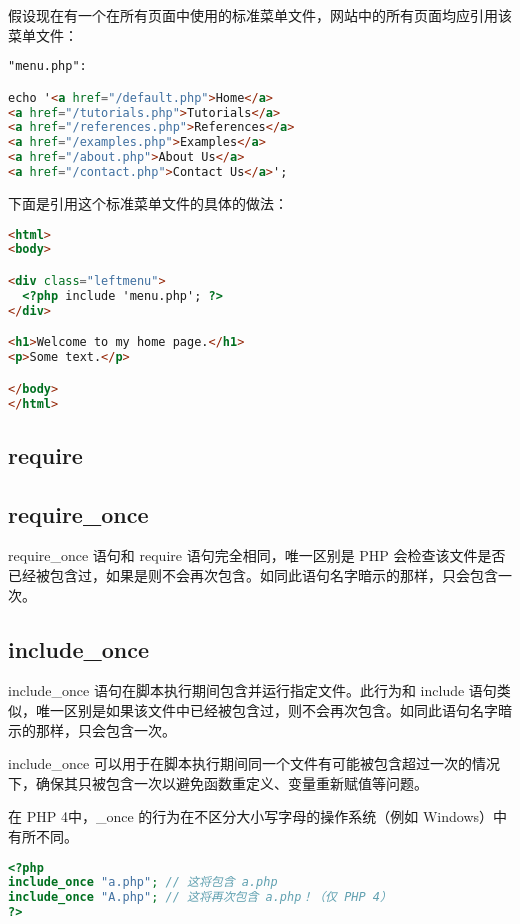 假设现在有一个在所有页面中使用的标准菜单文件，网站中的所有页面均应引用该菜单文件：

\begin{lstlisting}[language=HTML]
"menu.php":

echo '<a href="/default.php">Home</a>
<a href="/tutorials.php">Tutorials</a>
<a href="/references.php">References</a>
<a href="/examples.php">Examples</a>
<a href="/about.php">About Us</a>
<a href="/contact.php">Contact Us</a>';
\end{lstlisting}

下面是引用这个标准菜单文件的具体的做法：

\begin{lstlisting}[language=HTML]
<html>
<body>

<div class="leftmenu">
  <?php include 'menu.php'; ?>
</div>

<h1>Welcome to my home page.</h1>
<p>Some text.</p>

</body>
</html>
\end{lstlisting}


\subsection{require}



\subsection{require\_once}

require\_once 语句和 require 语句完全相同，唯一区别是 PHP 会检查该文件是否已经被包含过，如果是则不会再次包含。如同此语句名字暗示的那样，只会包含一次。

\subsection{include\_once}

include\_once 语句在脚本执行期间包含并运行指定文件。此行为和 include 语句类似，唯一区别是如果该文件中已经被包含过，则不会再次包含。如同此语句名字暗示的那样，只会包含一次。

include\_once 可以用于在脚本执行期间同一个文件有可能被包含超过一次的情况下，确保其只被包含一次以避免函数重定义、变量重新赋值等问题。

在 PHP 4中，\_once 的行为在不区分大小写字母的操作系统（例如 Windows）中有所不同。


\begin{lstlisting}[language=PHP]
<?php
include_once "a.php"; // 这将包含 a.php
include_once "A.php"; // 这将再次包含 a.php！（仅 PHP 4）
?>
\end{lstlisting}

